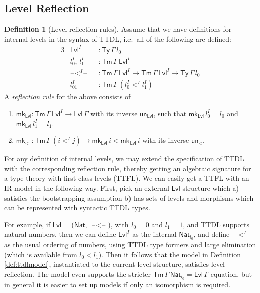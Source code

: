 \documentclass[a4paper,UKenglish,cleveref, autoref, thm-restate]{lipics-v2021}
\theoremstyle{remark}
\theoremstyle{definition}
\newtheorem{mydefinition}{Definition}
\newcommand{\Ty}{\mathsf{Ty}}
\newcommand{\Tm}{\mathsf{Tm}}
\newcommand{\blank}{\mathord{\hspace{1pt}\text{--}\hspace{1pt}}}
\newcommand{\Nat}{\mathsf{Nat}}
\newcommand{\Lvl}{\mathsf{Lvl}}
\newcommand{\msf}[1]{\mathsf{#1}}
\newcommand{\mkMor}{\msf{mk}\!_<}
\newcommand{\unMor}{\msf{un}\!_<}
\newcommand{\mkLvl}{\msf{mk}_{\Lvl}}
\newcommand{\unLvl}{\msf{un}_{\Lvl}}
\begin{document}
\subsection{Level Reflection}\label{sec:level_reflection}

\begin{mydefinition}[Level reflection rules]
Assume that we have definitions for internal levels in the syntax of TTDL,
i.e.\ all of the following are defined:
\begin{alignat*}{3}
  &\Lvl^I               &&: \Ty\,\Gamma\,l_0\\
  &l_0^I,\,l_1^I         &&: \Tm\,\Gamma\,\Lvl^I \\
  &\blank\!<^I\!\blank  &&: \Tm\,\Gamma\,\Lvl^I \to \Tm\,\Gamma\,\Lvl^I \to \Ty\,\Gamma\,l_0\\
  &l_{01}^{I}            &&: \Tm\,\Gamma\,(l_0^I <^I l_1^I)
\end{alignat*}
A \emph{reflection rule} for the above consists of
\begin{enumerate}
  \item $\mkLvl : \Tm\,\Gamma\,\Lvl^I \to \Lvl\,\Gamma$ with its inverse $\unLvl$, such that $\mkLvl\,l_0^I = l_0$ and $\mkLvl\,l_1^I = l_1$.
  \item $\mkMor\,\,: \Tm\,\Gamma\,(i <^I j) \to \mkLvl\,i < \mkLvl\,i$ with its inverse
        $\unMor$.
\end{enumerate}
\end{mydefinition}

For any definition of internal levels, we may extend the specification of TTDL
with the corresponding reflection rule, thereby getting an algebraic signature
for a type theory with first-class levels (TTFL). We can easily get a TTFL with
an IR model in the following way. First, pick an external $\Lvl$ structure which
a) satisfies the bootstrapping assumption b) has sets of levels and morphisms
which can be represented with syntactic TTDL types.

For example, if $\Lvl$ = ($\Nat$, $\blank\!<\!\blank$), with $l_0 = 0$ and $l_1
= 1$, and TTDL supports natural numbers, then we can define $\Lvl^I$ as the
internal $\Nat_{l_0}$, and define $\blank\!<^I\!\blank$ as the usual ordering of
numbers, using TTDL type formers and large elimination (which is available from
$l_0 < l_1$). Then it follows that the model in Definition \ref{def:ttdlmodel},
instantiated to the current level structure, satisfies level reflection. The
model even supports the stricter $\Tm\,\Gamma\,\Nat_{l_0} = \Lvl\,\Gamma$
equation, but in general it is easier to set up models if only an isomorphism
is required.
\end{document}
